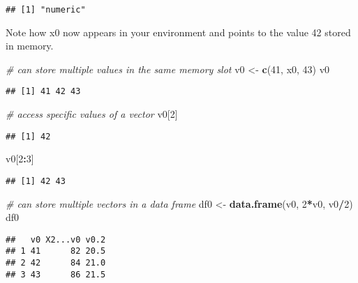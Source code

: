 \documentclass[]{article}
\newenvironment{Shaded}{\begin{snugshade}}{\end{snugshade}}
\newcommand{\CommentTok}[1]{\textcolor[rgb]{0.56,0.35,0.01}{\textit{#1}}}
\newcommand{\DecValTok}[1]{\textcolor[rgb]{0.00,0.00,0.81}{#1}}
\newcommand{\KeywordTok}[1]{\textcolor[rgb]{0.13,0.29,0.53}{\textbf{#1}}}
\newcommand{\NormalTok}[1]{#1}
\newcommand{\OperatorTok}[1]{\textcolor[rgb]{0.81,0.36,0.00}{\textbf{#1}}}
\newcommand{\StringTok}[1]{\textcolor[rgb]{0.31,0.60,0.02}{#1}}
\begin{document}
\begin{verbatim}
## [1] "numeric"
\end{verbatim}

Note how x0 now appears in your environment and points to the value 42
stored in memory.

\begin{Shaded}
\begin{Highlighting}[]
\CommentTok{# can store multiple values in the same memory slot }
\NormalTok{v0 <-}\StringTok{ }\KeywordTok{c}\NormalTok{(}\DecValTok{41}\NormalTok{, x0, }\DecValTok{43}\NormalTok{)}
\NormalTok{v0}
\end{Highlighting}
\end{Shaded}

\begin{verbatim}
## [1] 41 42 43
\end{verbatim}

\begin{Shaded}
\begin{Highlighting}[]
\CommentTok{# access specific values of a vector }
\NormalTok{v0[}\DecValTok{2}\NormalTok{]}
\end{Highlighting}
\end{Shaded}

\begin{verbatim}
## [1] 42
\end{verbatim}

\begin{Shaded}
\begin{Highlighting}[]
\NormalTok{v0[}\DecValTok{2}\OperatorTok{:}\DecValTok{3}\NormalTok{]}
\end{Highlighting}
\end{Shaded}

\begin{verbatim}
## [1] 42 43
\end{verbatim}

\begin{Shaded}
\begin{Highlighting}[]
\CommentTok{# can store multiple vectors in a data frame }
\NormalTok{df0 <-}\StringTok{ }\KeywordTok{data.frame}\NormalTok{(v0, }\DecValTok{2}\OperatorTok{*}\NormalTok{v0, v0}\OperatorTok{/}\DecValTok{2}\NormalTok{)}
\NormalTok{df0}
\end{Highlighting}
\end{Shaded}

\begin{verbatim}
##   v0 X2...v0 v0.2
## 1 41      82 20.5
## 2 42      84 21.0
## 3 43      86 21.5
\end{verbatim}
\end{document}
